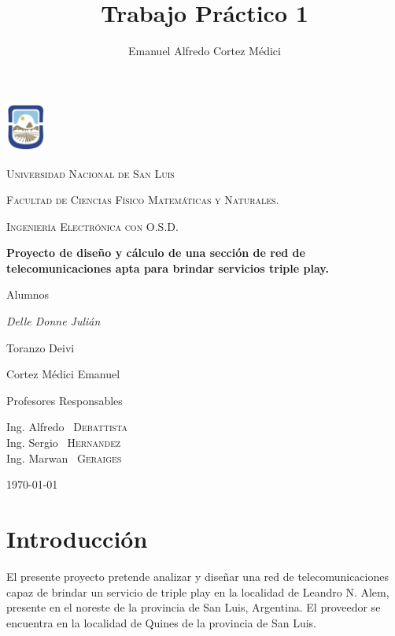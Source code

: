 \documentclass[11pt,a4paper]{article}
\author{Emanuel Alfredo Cortez Médici}
\title{Trabajo Práctico 1}
\begin{document}
	\begin{titlepage}
	\centering
	
	\includegraphics[width=0.1\textwidth]{fotos_ema/unsl.png} 
	
	{\scshape\LARGE Universidad Nacional de San Luis\par}
	{\scshape Facultad de Ciencias Físico Matemáticas y Naturales.\par}
	{\scshape Ingeniería Electrónica con O.S.D.\par}
	\vspace{1.5cm}
	{\scshape\Large  \par}
	\vspace{1.5cm}
	{\huge\bfseries  Proyecto de diseño y cálculo de una sección de red de telecomunicaciones apta para brindar servicios triple play. \par}

	\vspace{2cm}
	Alumnos\par
	{\Large\itshape Delle Donne Julián \par 
	Toranzo Deivi \par 
	Cortez Médici Emanuel\par}
	\vfill
	Profesores Responsables\par
	Ing. Alfredo ~\textsc{Debattista}\\
	Ing. Sergio ~\textsc{Hernandez} \\
	Ing. Marwan ~\textsc{Geraiges}
	
	\vfill

	{\large \today\par}
\end{titlepage}

\newpage

\tableofcontents

\clearpage
\part{Introducción}

El presente proyecto pretende analizar y diseñar una red de telecomunicaciones capaz de brindar un servicio de triple play en la localidad de  Leandro N. Alem, presente en el noreste de la provincia de San Luis, Argentina. El proveedor se encuentra en la localidad de Quines de la provincia de San Luis.
\end{document}
